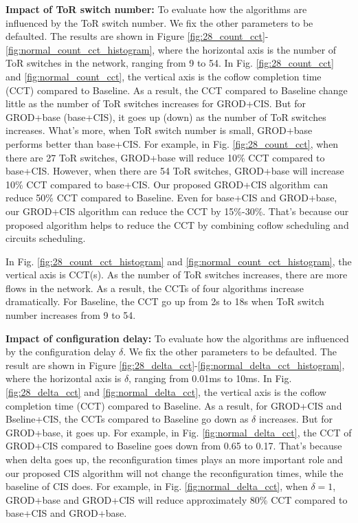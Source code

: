\textbf{Impact of ToR switch number:}
To evaluate how the algorithms are influenced by the ToR switch number. We fix the other parameters to be defaulted. The results are shown in Figure \ref{fig:28_count_cct}-\ref{fig:normal_count_cct_histogram}, where the horizontal axis is the number of ToR switches in the network, ranging from 9 to 54. In Fig. \ref{fig:28_count_cct} and \ref{fig:normal_count_cct}, the vertical axis is the coflow completion time (CCT) compared to Baseline. As a result, the CCT compared to Baseline change little as the number of ToR switches increases for GROD+CIS. But for GROD+base (base+CIS), it goes up (down) as the number of ToR switches increases. What's more, when ToR switch number is small, GROD+base performs better than base+CIS. For example, in Fig. \ref{fig:28_count_cct}, when there are 27 ToR switches, GROD+base will reduce 10\% CCT compared to base+CIS. However, when there are 54 ToR switches, GROD+base will increase 10\% CCT compared to base+CIS. Our proposed GROD+CIS algorithm can reduce 50\% CCT compared to Baseline. Even for base+CIS and GROD+base, our GROD+CIS algorithm can reduce the CCT by 15\%-30\%. That's because our proposed algorithm helps to reduce the CCT by combining coflow scheduling and circuits scheduling.

In Fig. \ref{fig:28_count_cct_histogram} and \ref{fig:normal_count_cct_histogram}, the vertical axis is CCT(s). As the number of ToR switches increases, there are more flows in the network. As a result, the CCTs of four algorithms increase dramatically. For Baseline, the CCT go up from 2s to 18s when ToR switch number increases from 9 to 54.

\textbf{Impact of configuration delay:}
To evaluate how the algorithms are influenced by the configuration delay $\delta$. We fix the other parameters to be defaulted. The result are shown in Figure \ref{fig:28_delta_cct}-\ref{fig:normal_delta_cct_histogram}, where the horizontal axis is $\delta$, ranging from 0.01ms to 10ms. In Fig. \ref{fig:28_delta_cct} and \ref{fig:normal_delta_cct}, the vertical axis is the coflow completion time (CCT) compared to Baseline. As a result, for GROD+CIS and Bseline+CIS, the CCTs compared to Baseline go down as $\delta$ increases. But for GROD+base, it goes up. For example, in Fig. \ref{fig:normal_delta_cct}, the CCT of GROD+CIS compared to Baseline goes down from 0.65 to 0.17. That's because when delta goes up, the reconfiguration times plays an more important role and our proposed CIS algorithm will not change the reconfiguration times, while the baseline of CIS does. For example, in Fig. \ref{fig:normal_delta_cct}, when $\delta=1$, GROD+base and GROD+CIS will reduce approximately 80\% CCT compared to base+CIS and GROD+base.


